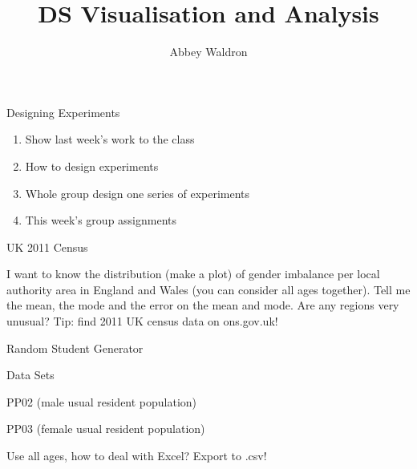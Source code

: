 \documentclass{beamer}
\newif\ifplacelogo
\begin{document}
\setlength{\unitlength}{1mm}
\title{DS Visualisation and Analysis}
\author[Abbey Waldron]{Abbey Waldron}
\date[October 9th, 2015]{}





{
\placelogofalse
\begin{frame}
  \titlepage
\end{frame}
}



\begin{frame}{Designing Experiments}

\begin{enumerate}
\item Show last week's work to the class
\item How to design experiments
\item Whole group design one series of experiments
\item This week's group assignments
\end{enumerate}

\end{frame}




\begin{frame}{UK 2011 Census}

I want to know the distribution (make a plot) of gender imbalance per local authority area in England and Wales (you can consider all ages together).  Tell me the mean, the mode and the error on the mean and mode.  Are any regions very unusual?  Tip: find 2011 UK census data on ons.gov.uk!

\end{frame}



\begin{frame}{Random Student Generator}

\end{frame}


\begin{frame}{Data Sets}

PP02 (male usual resident population)

\vspace{5mm}

PP03 (female usual resident population)

\vspace{5mm}

Use all ages, how to deal with Excel?  Export to .csv!


\end{frame}
\end{document}
